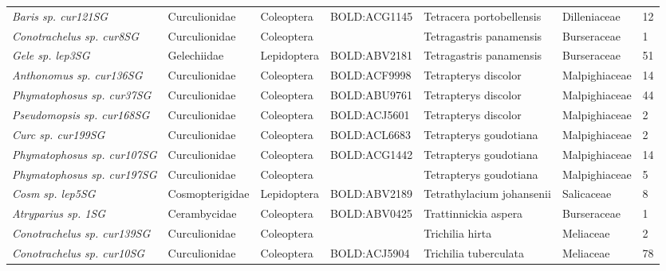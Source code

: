 \documentclass[11pt]{article}
\begin{document}
\begin{landscape}
\begin{longtable}{@{}lllllll@{}}
\textit{Baris sp. cur121SG}                           & Curculionidae   & Coleoptera   & BOLD:ACG1145 & Tetracera portobellensis           & Dilleniaceae     & 12    \\
\textit{Conotrachelus sp. cur8SG}                     & Curculionidae   & Coleoptera   &              & Tetragastris panamensis            & Burseraceae      & 1     \\
\textit{Gele sp. lep3SG}                              & Gelechiidae     & Lepidoptera  & BOLD:ABV2181 & Tetragastris panamensis            & Burseraceae      & 51    \\
\textit{Anthonomus sp. cur136SG}                      & Curculionidae   & Coleoptera   & BOLD:ACF9998 & Tetrapterys discolor               & Malpighiaceae    & 14    \\
\textit{Phymatophosus sp. cur37SG}                    & Curculionidae   & Coleoptera   & BOLD:ABU9761 & Tetrapterys discolor               & Malpighiaceae    & 44    \\
\textit{Pseudomopsis sp. cur168SG}                    & Curculionidae   & Coleoptera   & BOLD:ACJ5601 & Tetrapterys discolor               & Malpighiaceae    & 2     \\
\textit{Curc sp. cur199SG}                            & Curculionidae   & Coleoptera   & BOLD:ACL6683 & Tetrapterys goudotiana             & Malpighiaceae    & 2     \\
\textit{Phymatophosus sp. cur107SG}                   & Curculionidae   & Coleoptera   & BOLD:ACG1442 & Tetrapterys goudotiana             & Malpighiaceae    & 14    \\
\textit{Phymatophosus sp. cur197SG}                   & Curculionidae   & Coleoptera   &              & Tetrapterys goudotiana             & Malpighiaceae    & 5     \\
\textit{Cosm sp. lep5SG}                              & Cosmopterigidae & Lepidoptera  & BOLD:ABV2189 & Tetrathylacium johansenii          & Salicaceae       & 8     \\
\textit{Atryparius sp. 1SG}                           & Cerambycidae    & Coleoptera   & BOLD:ABV0425 & Trattinnickia aspera               & Burseraceae      & 1     \\
\textit{Conotrachelus sp. cur139SG}                   & Curculionidae   & Coleoptera   &              & Trichilia hirta                    & Meliaceae        & 2     \\
\textit{Conotrachelus sp. cur10SG}                    & Curculionidae   & Coleoptera   & BOLD:ACJ5904 & Trichilia tuberculata              & Meliaceae        & 78    \\

\end{longtable}
\end{landscape}
\end{document}
